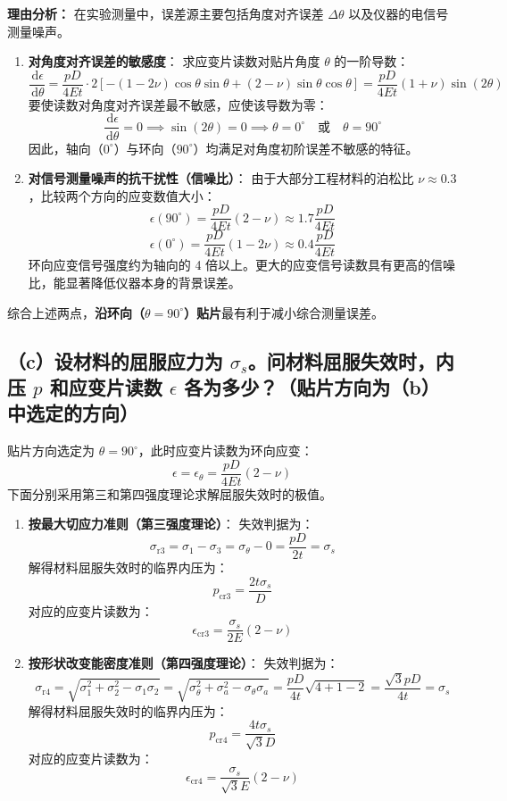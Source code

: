 \documentclass[UTF8,fontset=windows]{ctexart}
\newcommand{\diff}{\,\mathrm{d}}
\begin{document}
\textbf{理由分析：}
在实验测量中，误差源主要包括角度对齐误差 $\Delta \theta$ 以及仪器的电信号测量噪声。
\begin{enumerate}
    \item \textbf{对角度对齐误差的敏感度}：
          求应变片读数对贴片角度 $\theta$ 的一阶导数：
          \[
              \frac{\diff \epsilon}{\diff \theta} = \frac{pD}{4Et} \cdot 2 \left[ -(1 - 2\nu)\cos\theta\sin\theta + (2-\nu)\sin\theta\cos\theta \right] = \frac{pD}{4Et} (1+\nu)\sin(2\theta)
          \]
          要使读数对角度对齐误差最不敏感，应使该导数为零：
          \[
              \frac{\diff \epsilon}{\diff \theta} = 0 \implies \sin(2\theta) = 0 \implies \theta = 0^\circ \quad \text{或} \quad \theta = 90^\circ
          \]
          因此，轴向（$0^\circ$）与环向（$90^\circ$）均满足对角度初阶误差不敏感的特征。
    \item \textbf{对信号测量噪声的抗干扰性（信噪比）}：
          由于大部分工程材料的泊松比 $\nu \approx 0.3$，比较两个方向的应变数值大小：
          \[
              \epsilon(90^\circ) = \frac{pD}{4Et} (2-\nu) \approx 1.7 \frac{pD}{4Et}
          \]
          \[
              \epsilon(0^\circ) = \frac{pD}{4Et} (1-2\nu) \approx 0.4 \frac{pD}{4Et}
          \]
          环向应变信号强度约为轴向的 4 倍以上。更大的应变信号读数具有更高的信噪比，能显著降低仪器本身的背景误差。
\end{enumerate}
综合上述两点，\textbf{沿环向（$\theta = 90^\circ$）贴片}最有利于减小综合测量误差。

\subsection*{（c）设材料的屈服应力为 $\sigma_s$。问材料屈服失效时，内压 $p$ 和应变片读数 $\epsilon$ 各为多少？（贴片方向为（b）中选定的方向）}

贴片方向选定为 $\theta = 90^\circ$，此时应变片读数为环向应变：
\[
    \epsilon = \epsilon_\theta = \frac{pD}{4Et} (2 - \nu)
\]
下面分别采用第三和第四强度理论求解屈服失效时的极值。
\begin{enumerate}
    \item \textbf{按最大切应力准则（第三强度理论）}：
          失效判据为：
          \[
              \sigma_{\text{r3}} = \sigma_1 - \sigma_3 = \sigma_\theta - 0 = \frac{pD}{2t} = \sigma_s
          \]
          解得材料屈服失效时的临界内压为：
          \[
              p_{\text{cr3}} = \frac{2t\sigma_s}{D}
          \]
          对应的应变片读数为：
          \[
              \epsilon_{\text{cr3}} = \frac{\sigma_s}{2E} (2 - \nu)
          \]
    \item \textbf{按形状改变能密度准则（第四强度理论）}：
          失效判据为：
          \[
              \sigma_{\text{r4}} = \sqrt{\sigma_1^2 + \sigma_2^2 - \sigma_1\sigma_2} = \sqrt{\sigma_\theta^2 + \sigma_a^2 - \sigma_\theta\sigma_a} = \frac{pD}{4t} \sqrt{4 + 1 - 2} = \frac{\sqrt{3}pD}{4t} = \sigma_s
          \]
          解得材料屈服失效时的临界内压为：
          \[
              p_{\text{cr4}} = \frac{4t\sigma_s}{\sqrt{3}D}
          \]
          对应的应变片读数为：
          \[
              \epsilon_{\text{cr4}} = \frac{\sigma_s}{\sqrt{3}E} (2 - \nu)
          \]
\end{enumerate}
\end{document}
